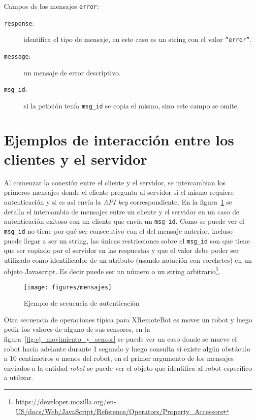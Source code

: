 Campos de los mensajes \texttt{error}:
\begin{description}
    \item[\texttt{response}:] identifica el tipo de mensaje, en este caso
        es un string con el valor \texttt{``error''}.
    \item[\texttt{message}:] un mensaje de error descriptivo.
    \item[\texttt{msg\_id}:] si la petición tenía \texttt{msg\_id} se
        copia el mismo, sino este campo se omite.
\end{description}


\section{Ejemplos de interacción entre los clientes y el servidor}

Al comenzar la conexión entre el cliente y el servidor, se intercambian
los primeros mensajes donde el cliente pregunta al servidor si el
mismo requiere autenticación y si es así envía la \textit{API key}
correspondiente. En la figura~\ref{fig:ej_autenticacion} se detalla
el intercambio de mensajes entre un cliente y el servidor en un
caso de autenticación exitoso con un cliente que envía un \texttt{msg\_id}.
Como se puede ver el \texttt{msg\_id}
no tiene por qué ser consecutivo con el del mensaje anterior, incluso
puede llegar a ser un string, las únicas restricciones sobre el
\texttt{msg\_id} son que tiene que ser copiado por el servidor
en las respuestas y que el valor debe poder ser utilizado como
identificador de un atributo (usando notación con corchetes) en un
objeto Javascript. Es decir puede ser un número o un string
arbitrario\footnote{\url{https://developer.mozilla.org/en-US/docs/Web/JavaScript/Reference/Operators/Property\_Accessors}}.

\begin{figure}
    \centering
    \texttt{[image: figures/mensajes]}
    \caption{Ejemplo de secuencia de autenticación}
    \label{fig:ej_autenticacion}
\end{figure}

Otra secuencia de operaciones típica para XRemoteBot es mover un robot
y luego pedir los valores de alguno de sus sensores, en la
figura~\ref{fig:ej_movimiento_y_sensor} se puede ver un caso donde se
mueve el robot hacia adelante durante 1 segundo y luego consulta si
existe algún obstáculo a 10 centímetros o menos del robot, en el primer
argumento de los mensajes
enviados a la entidad \textit{robot} se puede ver el objeto que identifica
al robot específico a utilizar.


